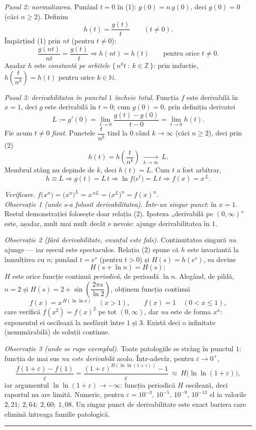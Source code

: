 \emph{Pasul 2: normalizarea.} Punând $t=0$ în (1): $g(0)=n\,g(0)$, deci $g(0)=0$ (căci $n\ge2$). Definim
\[ h(t)=\frac{g(t)}{t}\qquad(t\neq0) . \]
Împărțind (1) prin $nt$ (pentru $t\neq0$):
\[ \frac{g(nt)}{nt}=\frac{g(t)}{t} \Longrightarrow h(nt)=h(t)\qquad\text{pentru orice }t\neq0 . \tag{2} \]
Așadar $h$ este \emph{constantă pe orbitele} $\{\,n^{k}t\ :\ k\in\mathbb{Z}\,\}$: prin inducție, $h\!\left(\dfrac{t}{n^{k}}\right)=h(t)$ pentru orice $k\in\mathbb{N}$.

\emph{Pasul 3: derivabilitatea în punctul $1$ încheie totul.} Funcția $f$ este derivabilă în $x=1$, deci $g$ este derivabilă în $t=0$; cum $g(0)=0$, prin definiția derivatei
\[ L:=g'(0)=\lim_{t\to0}\frac{g(t)-g(0)}{t-0}=\lim_{t\to0}h(t) . \]
Fie acum $t\neq0$ \emph{fixat}. Punctele $\dfrac{t}{n^{k}}$ tind la $0$ când $k\to\infty$ (căci $n\ge2$), deci prin (2)
\[ h(t)=h\!\left(\frac{t}{n^{k}}\right)\ \xrightarrow[k\to\infty]{}\ L . \]
Membrul stâng nu depinde de $k$, deci $h(t)=L$. Cum $t$ a fost arbitrar,
\[ h\equiv L \Longrightarrow g(t)=L\,t \Longrightarrow \ln f\bigl(e^{t}\bigr)=L\,t \Longrightarrow f(x)=x^{\,L} . \]

\emph{Verificare.} $f\bigl(x^{n}\bigr)=\bigl(x^{n}\bigr)^{L}=x^{\,nL}=\bigl(x^{L}\bigr)^{n}=f(x)^{n}$. \checkmark\\[2pt]
\emph{Observație 1 (unde s-a folosit derivabilitatea).} \emph{Într-un singur punct}: în $x=1$. Restul demonstrației folosește doar relația (2). Ipoteza „derivabilă pe $(0,\infty)$'' este, așadar, mult mai mult decât e nevoie: ajunge derivabilitatea în $1$.

\emph{Observație 2 (fără derivabilitate, enunțul este fals).} Continuitatea singură \emph{nu} ajunge --- iar eșecul este spectaculos. Relația (2) spune că $h$ este invariantă la înmulțirea cu $n$; punând $t=e^{s}$ (pentru $t>0$) și $H(s)=h(e^{s})$, ea devine
\[ H(s+\ln n)=H(s) : \]
$H$ este orice funcție continuă \emph{periodică}, de perioadă $\ln n$. Alegând, de pildă, $n=2$ și $H(s)=2+\sin\!\left(\dfrac{2\pi s}{\ln 2}\right)$, obținem funcția continuă
\[ f(x)=x^{\,H(\ln\ln x)}\quad (x>1),\qquad f(x)=1\quad(0<x\le1) , \]
care verifică $f(x^{2})=f(x)^{2}$ pe tot $(0,\infty)$, dar \emph{nu} este de forma $x^{a}$: exponentul ei oscilează la nesfârșit între $1$ și $3$. Există deci o infinitate (nenumărabilă) de soluții continue.

\emph{Observație 3 (unde se rupe exemplul).} Toate patologiile se strâng în punctul $1$: funcția de mai sus \emph{nu este derivabilă} acolo. Într-adevăr, pentru $\varepsilon\to0^{+}$,
\[ \frac{f(1+\varepsilon)-f(1)}{\varepsilon}=\frac{(1+\varepsilon)^{H(\ln\ln(1+\varepsilon))}-1}{\varepsilon}\ \approx\ H\bigl(\ln\ln(1+\varepsilon)\bigr) , \]
iar argumentul $\ln\ln(1+\varepsilon)\to-\infty$: funcția periodică $H$ oscilează, deci raportul nu are limită. Numeric, pentru $\varepsilon=10^{-3},\,10^{-5},\,10^{-9},\,10^{-13}$ el ia valorile $2{,}21;\ 2{,}64;\ 2{,}60;\ 1{,}08$. Un singur punct de derivabilitate este exact bariera care elimină întreaga familie patologică.
\vspace{1mm}\hrule


